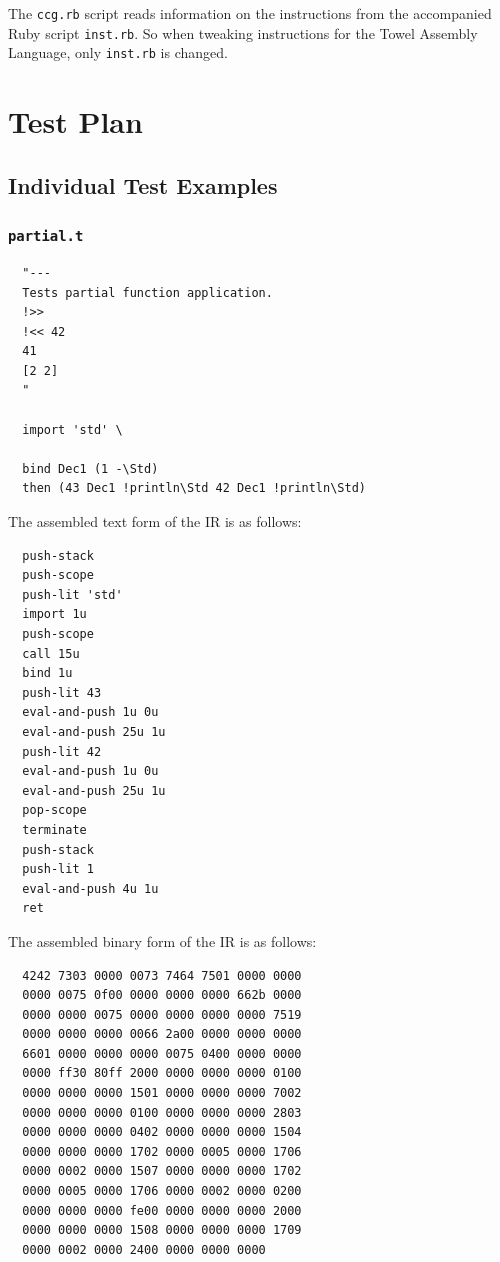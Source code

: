 \documentclass{report}
\begin{document}
\begin{mdframed}[style=detail]
  The \texttt{ccg.rb} script reads information on the instructions from the accompanied Ruby script \texttt{inst.rb}. So when tweaking instructions for the Towel Assembly Language, only \texttt{inst.rb} is changed.
\end{mdframed}

\chapter{Test Plan}

\section{Individual Test Examples}

\subsection{\texttt{partial.t}}
\begin{mdframed}[style=example]
\begin{verbatim}
  "---
  Tests partial function application.
  !>>
  !<< 42
  41
  [2 2]
  "

  import 'std' \

  bind Dec1 (1 -\Std)
  then (43 Dec1 !println\Std 42 Dec1 !println\Std)
\end{verbatim}
\end{mdframed}

The assembled text form of the IR is as follows:

\begin{mdframed}[style=example]
\begin{verbatim}
  push-stack
  push-scope
  push-lit 'std'
  import 1u
  push-scope
  call 15u
  bind 1u
  push-lit 43
  eval-and-push 1u 0u
  eval-and-push 25u 1u
  push-lit 42
  eval-and-push 1u 0u
  eval-and-push 25u 1u
  pop-scope
  terminate
  push-stack
  push-lit 1
  eval-and-push 4u 1u
  ret
\end{verbatim}
\end{mdframed}

The assembled binary form of the IR is as follows:

\begin{mdframed}[style=example]
\begin{verbatim}
  4242 7303 0000 0073 7464 7501 0000 0000
  0000 0075 0f00 0000 0000 0000 662b 0000
  0000 0000 0075 0000 0000 0000 0000 7519
  0000 0000 0000 0066 2a00 0000 0000 0000
  6601 0000 0000 0000 0075 0400 0000 0000
  0000 ff30 80ff 2000 0000 0000 0000 0100
  0000 0000 0000 1501 0000 0000 0000 7002
  0000 0000 0000 0100 0000 0000 0000 2803
  0000 0000 0000 0402 0000 0000 0000 1504
  0000 0000 0000 1702 0000 0005 0000 1706
  0000 0002 0000 1507 0000 0000 0000 1702
  0000 0005 0000 1706 0000 0002 0000 0200
  0000 0000 0000 fe00 0000 0000 0000 2000
  0000 0000 0000 1508 0000 0000 0000 1709
  0000 0002 0000 2400 0000 0000 0000
\end{verbatim}
\end{mdframed}
\end{document}
